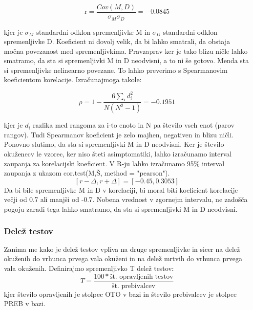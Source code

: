 \documentclass[a4paper,11pt]{article}
\begin{document}
\begin{center}
\[\text{r} = \frac{Cov(M,D)}{\sigma_{M} \sigma_{D}} = -0.0845\]
\end{center} 
kjer je \(\sigma_{M}\) standardni odklon spremenljivke M in \(\sigma_{D}\) standardni odklon spremenljivke D. Koeficient ni dovolj velik, da bi lahko smatrali, da obstaja močna povezanost med spremenljivkima. Pravzaprav ker je tako blizu ničle lahko smatramo, da sta si spremenljivki M in D neodvisni, a to ni še gotovo. Menda sta si spremenljivke nelinearno povezane. To lahko preverimo s Spearmanovim koeficientom korelacije. Izračunajmoga takole: 

\begin{center}
\[\rho = 1 - \frac{6\sum_{i}{}d_i^2}{N(N^2 - 1)} = -0.1951\]
\end{center} 

kjer je \( d_i \) razlika med rangoma za i-to enoto in N pa število vseh enot (parov rangov). Tudi Spearmanov koeficient je zelo majhen, negativen in blizu ničli. Ponovno slutimo, da sta si spremenljivki M in D neodvisni.
Ker je število okuženecv le vzorec, ker niso šteti asimptomatiki, lahko izračunamo interval zaupanja za korelacijski koeficient. V R-ju lahko izračunamo 95\% interval zaupanja z ukazom cor.test(M,Š, method = "pearson").
\[[r - \Delta, r + \Delta] = [-0.45, 0.3053]\]
Da bi bile spremenljivke M in D v korelaciji, bi moral biti koeficient korelacije večji od 0.7 ali manjši od -0.7. Nobena vrednost v zgornejm intervalu, ne zadošča pogoju zaradi tega lahko smatramo, da sta si spremenljivki M in D neodvisni.

\subsubsection{Delež testov}

Zanima me kako je delež testov vpliva na druge spremenljivke in sicer na delež okuženih do vrhunca prvega vala okuženi in na delež mrtvih do vrhunca prvega vala okuženih. Definirajmo spremenljivko T delež testov:
\[T = \frac{100 * \text{št. opravljenih testov}}{\text{št. prebivalcev}}\]
kjer število opravljenih je stolpec OTO v bazi in število prebivalcev je stolpec PREB v bazi.
\end{document}
